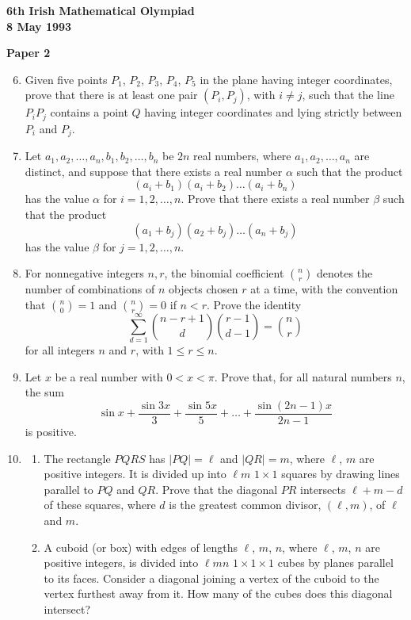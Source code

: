 \documentclass[12pt]{article}
\begin{document}
\newpage
\begin{center}
{\large\bfseries 6th Irish Mathematical Olympiad\\8 May 1993}
\end{center}
\bigskip\noindent\textbf{Paper 2}\bigskip
\begin{enumerate}
\setcounter{enumi}{5}
\item Given five points $P_1$, $P_2$, $P_3$, $P_4$, $P_5$ in the plane having integer coordinates, prove that there is at least one pair $(P_i, P_j)$, with $i \ne j$, such that the line $P_iP_j$ contains a point $Q$ having integer coordinates and lying strictly between $P_i$ and $P_j$.

\item Let $a_1, a_2, \ldots, a_n, b_1, b_2, \ldots, b_n$ be $2n$ real numbers, where $a_1, a_2, \ldots, a_n$ are distinct, and suppose that there exists a real number $\alpha$ such that the product
\[(a_i + b_1)(a_i + b_2)\ldots(a_i + b_n)\]
has the value $\alpha$ for $i = 1, 2, \ldots, n$. Prove that there exists a real number $\beta$ such that the product
\[(a_1 + b_j)(a_2 + b_j)\ldots(a_n + b_j)\]
has the value $\beta$ for $j = 1, 2, \ldots, n$.

\item For nonnegative integers $n, r$, the binomial coefficient $\binom{n}{r}$ denotes the number of combinations of $n$ objects chosen $r$ at a time, with the convention that $\binom{n}{0} = 1$ and $\binom{n}{r} = 0$ if $n < r$. Prove the identity
\[\sum_{d=1}^{\infty} \binom{n-r+1}{d}\binom{r-1}{d-1} = \binom{n}{r}\]
for all integers $n$ and $r$, with $1 \le r \le n$.

\item Let $x$ be a real number with $0 < x < \pi$. Prove that, for all natural numbers $n$, the sum
\[\sin x + \frac{\sin 3x}{3} + \frac{\sin 5x}{5} + \ldots + \frac{\sin(2n-1)x}{2n-1}\]
is positive.

\item \begin{enumerate}
\item[(a)] The rectangle $PQRS$ has $|PQ| = \ell$ and $|QR| = m$, where $\ell$, $m$ are positive integers. It is divided up into $\ell m$ $1\times 1$ squares by drawing lines parallel to $PQ$ and $QR$. Prove that the diagonal $PR$ intersects $\ell + m - d$ of these squares, where $d$ is the greatest common divisor, $(\ell, m)$, of $\ell$ and $m$.
\item[(b)] A cuboid (or box) with edges of lengths $\ell$, $m$, $n$, where $\ell$, $m$, $n$ are positive integers, is divided into $\ell mn$ $1 \times 1 \times 1$ cubes by planes parallel to its faces. Consider a diagonal joining a vertex of the cuboid to the vertex furthest away from it. How many of the cubes does this diagonal intersect?
\end{enumerate}
\end{enumerate}
\end{document}
